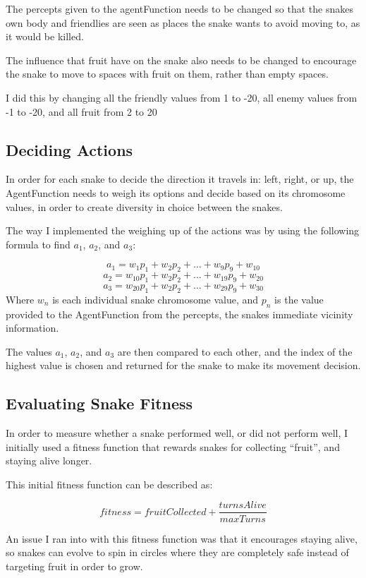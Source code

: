\documentclass[12pt]{article}
\begin{document}
The percepts given to the agentFunction needs to be changed so that the snakes own body and friendlies are seen as places the snake wants to avoid moving to, as it would be killed.

The influence that fruit have on the snake also needs to be changed to encourage the snake to move to spaces with fruit on them, rather than empty spaces.

I did this by changing all the friendly values from 1 to -20, all enemy values from -1 to -20, and all fruit from 2 to 20

\subsection{Deciding Actions}

In order for each snake to decide the direction it travels in: left, right, or up, the AgentFunction needs to weigh its options and decide based on its chromosome values, in order to create diversity in choice between the snakes.

The way I implemented the weighing up of the actions was by using the following formula to find $a_1$, $a_2$, and $a_3$:

      \[a_1 = w_1p_1 + w_2p_2 + \ldots + w_9p_9 + w_{10}\] 
      \[a_2 = w_{10}p_1 + w_2p_2 + \ldots + w_{19}p_9 + w_{20}\]
      \[a_3 = w_{20}p_1 + w_2p_2 + \ldots + w_{29}p_9 + w_{30}\] \newline
Where $w_n$ is each individual snake chromosome value, and $p_n$ is the value provided to the AgentFunction from the percepts, the snakes immediate vicinity information.

The values $a_1$, $a_2$, and $a_3$ are then compared to each other, and the index of the highest value is chosen and returned for the snake to make its movement decision.

\subsection{Evaluating Snake Fitness}

In order to measure whether a snake performed well, or did not perform well, I initially used a fitness function that rewards snakes for collecting ``fruit'', and staying alive longer.

This initial fitness function can be described as:
      
      \[fitness = fruitCollected + \frac{turnsAlive}{maxTurns}\]

An issue I ran into with this fitness function was that it encourages staying alive, so snakes can evolve to spin in circles where they are completely safe instead of targeting fruit in order to grow.
\end{document}
